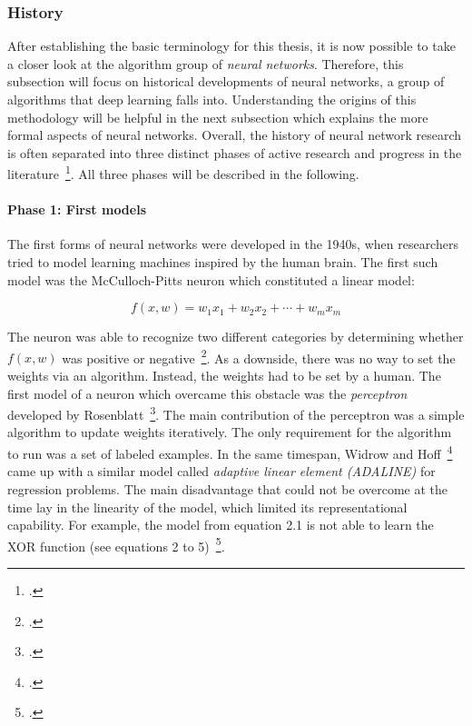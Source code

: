 \subsubsection{History}
\label{sub:dl_history}

After establishing the basic terminology for this thesis, 
it is now possible to take a closer look at the algorithm group of 
\textit{neural networks}. Therefore, this subsection will focus on historical
developments of neural networks, a group of algorithms that deep learning falls
into.
Understanding the origins of this methodology will be helpful in the next 
subsection which explains the more formal aspects of neural networks.
Overall, the history of neural network research is often separated into three
distinct phases of active research and progress in the literature~\footcite{Goodfellow2016}.
All three phases will be described in the following.

\paragraph{Phase 1: First models}

The first forms of neural networks were developed in the 1940s, when
researchers tried to model learning machines inspired by the human brain.
The first such model was the McCulloch-Pitts neuron which constituted a linear
model:

\begin{equation}
  f (x, w) = w_1 x_1 + w_2 x_2 + \cdots + w_m x_m
\end{equation}

The neuron was able to recognize two different categories by determining
whether $f(x, w)$ was positive or negative~\footcite{McCulloch1943}.
As a downside, there was no way to set the weights via an algorithm.
Instead, the weights had to be set by a human.
The first model of a neuron which overcame this obstacle was the \textit{perceptron}
developed by Rosenblatt~\footcite{Rosenblatt1958}. The main contribution of the
perceptron was a simple algorithm to update weights iteratively.
The only requirement for the algorithm to run was a set of labeled examples.
In the same timespan, Widrow and Hoff~\footcite{Widrow1960} came up with a similar
model called \textit{adaptive linear element (ADALINE)} for regression problems.
The main disadvantage that could not be overcome at the time lay in the 
linearity of the model, which limited its representational capability.
For example, the model from equation 2.1 is not able to learn the XOR function 
(see equations 2 to 5)~\footcite{Minsky1969}.

